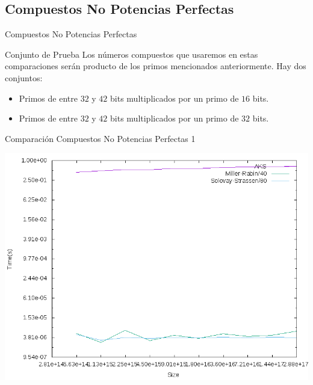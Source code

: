 \documentclass{beamer}
\begin{document}
\subsection{Compuestos No Potencias Perfectas}

\begin{frame}
	\centering
	\begin{Large}
		Compuestos No Potencias Perfectas
	\end{Large}
\end{frame}

\begin{frame}{Conjunto de Prueba}
	Los números compuestos que usaremos en estas comparaciones serán producto de los primos mencionados anteriormente. Hay dos conjuntos:\break
	
	\begin{itemize}[<+(1)->]
		\item Primos de entre $32$ y $42$ bits multiplicados por un primo de $16$ bits.
		
		\item Primos de entre $32$ y $42$ bits multiplicados por un primo de $32$ bits.
	\end{itemize}
\end{frame}

\begin{frame}{Comparación Compuestos No Potencias Perfectas 1}
	\begin{alertblock}{}
		\begin{center}
			\includegraphics[scale=0.40]{../Memoria/img/graphs/aks-probs-comps-16-mean}
		\end{center}
	\end{alertblock}
\end{frame}
\end{document}

